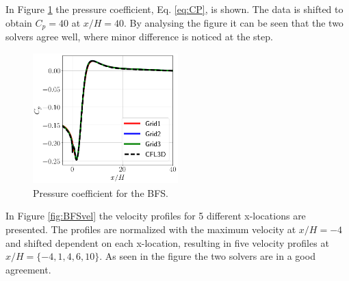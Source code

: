 In Figure \ref{fig:BFSCP} the pressure coefficient, Eq. \ref{eq:CP}, is shown. The data is shifted to obtain $C_p=40$ at $x/H=40$. By analysing the figure it can be seen that the two solvers agree well, where minor difference is noticed at the step.
\begin{figure}[h!]
  \centering
  \includegraphics[width=0.5\textwidth]{figures/BFSCp.png}
  \caption{Pressure coefficient for the BFS.} \label{fig:BFSCP}
\end{figure}

In Figure \ref{fig:BFSvel} the velocity profiles for 5 different x-locations are presented. The profiles are normalized with the maximum velocity at $x/H=-4$ and shifted dependent on each x-location, resulting in five velocity profiles at $x/H=\{-4,1,4,6,10\}$. As seen in the figure the two solvers are in a good agreement. 

